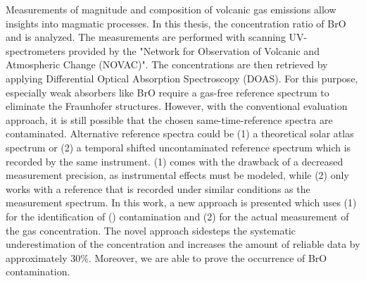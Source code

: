

Measurements of magnitude and composition of volcanic gas emissions allow insights into magmatic processes. In this thesis, the concentration ratio of BrO and  is analyzed. The measurements are performed with scanning UV-spectrometers provided by the "Network for Observation of Volcanic and Atmospheric Change (NOVAC)".
The concentrations are then retrieved by applying Differential Optical Absorption Spectroscopy (DOAS).
For this purpose, especially weak absorbers like BrO require a gas-free reference spectrum to eliminate the Fraunhofer structures.
However, with the conventional evaluation approach, it is still possible that the chosen same-time-reference spectra are contaminated. Alternative reference spectra could be (1) a theoretical solar atlas spectrum or (2) a temporal shifted uncontaminated reference spectrum which is recorded by the same instrument. (1) comes with the drawback of a decreased measurement precision, as instrumental effects must be modeled, while (2) only works with a reference that is recorded under similar conditions as the measurement spectrum. In this work, a new approach is presented which uses (1) for the identification of () contamination and (2) for the actual measurement of the gas concentration. The novel approach sidesteps the systematic underestimation of the concentration and increases the amount of reliable data by approximately 30\%. Moreover, we are able to prove the occurrence of BrO contamination.